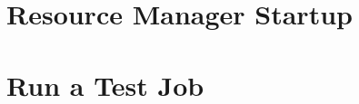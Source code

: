 \documentclass[letterpaper]{article}
\begin{document}
\section{Resource Manager Startup}


\section{Run a Test Job}




\end{document}
